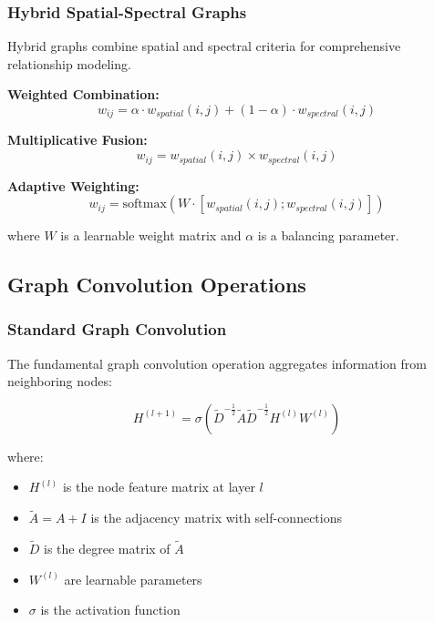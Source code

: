 \documentclass[journal]{IEEEtran}
\begin{document}
\subsubsection{Hybrid Spatial-Spectral Graphs}

Hybrid graphs combine spatial and spectral criteria for comprehensive relationship modeling.

\textbf{Weighted Combination:}
\begin{equation}
w_{ij} = \alpha \cdot w_{spatial}(i,j) + (1-\alpha) \cdot w_{spectral}(i,j)
\end{equation}

\textbf{Multiplicative Fusion:}
\begin{equation}
w_{ij} = w_{spatial}(i,j) \times w_{spectral}(i,j)
\end{equation}

\textbf{Adaptive Weighting:}
\begin{equation}
w_{ij} = \text{softmax}(W \cdot [w_{spatial}(i,j); w_{spectral}(i,j)])
\end{equation}

where $W$ is a learnable weight matrix and $\alpha$ is a balancing parameter.

\subsection{Graph Convolution Operations}

\subsubsection{Standard Graph Convolution}

The fundamental graph convolution operation aggregates information from neighboring nodes:

\begin{equation}
H^{(l+1)} = \sigma\left(\tilde{D}^{-\frac{1}{2}}\tilde{A}\tilde{D}^{-\frac{1}{2}}H^{(l)}W^{(l)}\right)
\end{equation}

where:
\begin{itemize}
\item $H^{(l)}$ is the node feature matrix at layer $l$
\item $\tilde{A} = A + I$ is the adjacency matrix with self-connections
\item $\tilde{D}$ is the degree matrix of $\tilde{A}$
\item $W^{(l)}$ are learnable parameters
\item $\sigma$ is the activation function
\end{itemize}
\end{document}
